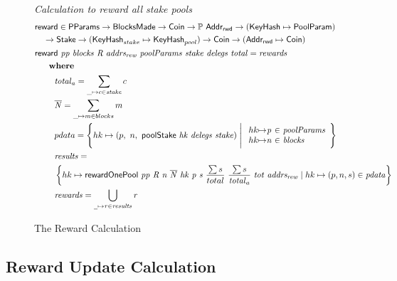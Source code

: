 \begin{figure}[htb]
  \emph{Calculation to reward all stake pools}
  \begin{align*}
      & \fun{reward} \in \PParams \to \BlocksMade \to \Coin\to \powerset{\AddrRWD}
      \to (\KeyHash \mapsto \PoolParam) \\
      & ~~~\to \Stake \to (\KeyHash_{stake} \mapsto \KeyHash_{pool}) \to
      \Coin \to (\AddrRWD \mapsto \Coin)\\
      & \reward{pp}{blocks}{R}{addrs_{rew}}{poolParams}{stake}{delegs}{total}
          = \var{rewards}\\
      & ~~~\where \\
      & ~~~~~~~\var{total}_a = \sum_{\_\mapsto c\in \var{stake}}c \\
      & ~~~~~~~\var{\overline{N}} = \sum_{\_\mapsto m\in blocks}m \\
      & ~~~~~~~pdata = \left\{
        hk\mapsto \left(p,~n,~\poolStake{hk}{delegs}{stake}\right)
        \mathrel{\Bigg|}
        \begin{array}{r@{\mapsto}c@{~\in~}l}
          hk & \var{p} & \var{poolParams} \\
          hk & \var{n} & \var{blocks} \\
        \end{array}
      \right\} \\
      & ~~~~~~~\var{results} = \\
      & ~~~~~~~\left\{
        hk \mapsto \fun{rewardOnePool}~
                     \var{pp}~
                     \var{R}~
                     \var{n}~
                     \var{\overline{N}}~
                     \var{hk}~
                     \var{p}~
                     \var{s}~
                     \frac{\sum s}{total}~
                     \frac{\sum s}{\var{total}_a}~
                     \var{tot}~
                     \var{addrs_{rew}}
                 \mid
        hk\mapsto(p, n, s)\in\var{pdata} \right\} \\
      & ~~~~~~~\var{rewards} = \bigcup_{\wcard\mapsto\var{r}\in\var{results}}\var{r}
  \end{align*}
  \caption{The Reward Calculation}
  \label{fig:functions:reward-calc}
\end{figure}

\clearpage

\subsection{Reward Update Calculation}
\label{sec:reward-calc}

